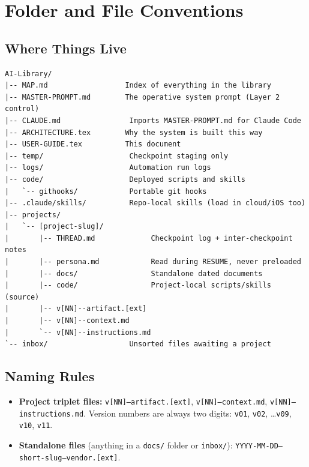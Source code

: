 \documentclass[12pt,letterpaper]{article}
\begin{document}
\section{Folder and File Conventions}

\subsection{Where Things Live}

\begin{lstlisting}
AI-Library/
|-- MAP.md                  Index of everything in the library
|-- MASTER-PROMPT.md        The operative system prompt (Layer 2 control)
|-- CLAUDE.md                Imports MASTER-PROMPT.md for Claude Code
|-- ARCHITECTURE.tex        Why the system is built this way
|-- USER-GUIDE.tex          This document
|-- temp/                    Checkpoint staging only
|-- logs/                    Automation run logs
|-- code/                    Deployed scripts and skills
|   `-- githooks/            Portable git hooks
|-- .claude/skills/          Repo-local skills (load in cloud/iOS too)
|-- projects/
|   `-- [project-slug]/
|       |-- THREAD.md             Checkpoint log + inter-checkpoint notes
|       |-- persona.md            Read during RESUME, never preloaded
|       |-- docs/                 Standalone dated documents
|       |-- code/                 Project-local scripts/skills (source)
|       |-- v[NN]--artifact.[ext]
|       |-- v[NN]--context.md
|       `-- v[NN]--instructions.md
`-- inbox/                   Unsorted files awaiting a project
\end{lstlisting}

\subsection{Naming Rules}

\begin{itemize}
\item \textbf{Project triplet files:} \texttt{v[NN]--artifact.[ext]},
      \texttt{v[NN]--context.md}, \texttt{v[NN]--instructions.md}.
      Version numbers are always two digits: \texttt{v01}, \texttt{v02},
      \ldots \texttt{v09}, \texttt{v10}, \texttt{v11}.
\item \textbf{Standalone files} (anything in a \texttt{docs/} folder or
      \texttt{inbox/}): \texttt{YYYY-MM-DD--short-slug--vendor.[ext]}.
\end{itemize}
\end{document}
